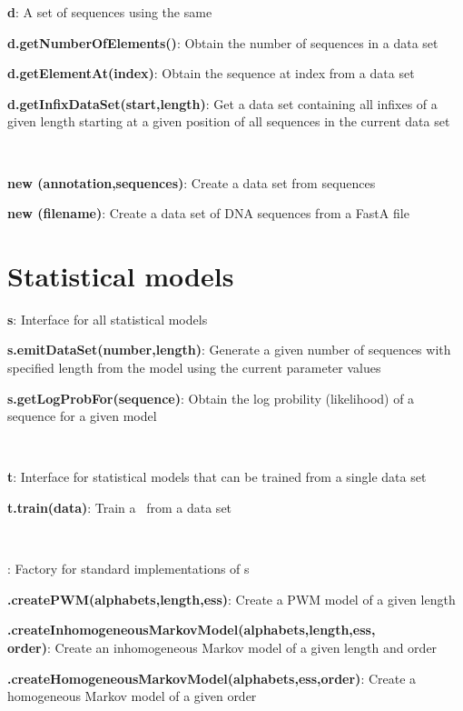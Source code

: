 \documentclass[10pt]{scrartcl}
\newcommand{\entry}[3]{{\bfseries #1#2}: #3}
\begin{document}
\begin{flushleft}
\entry{\DataSet}{ d}{A set of sequences using the same \AlphabetContainer}

\entry{d}{.getNumberOfElements()}{Obtain the number of sequences in a data set}

\entry{d}{.getElementAt(index)}{Obtain the sequence at index from a data set}

\entry{d}{.getInfixDataSet(start,length)}{Get a data set containing all infixes of a given length starting at a given position of all sequences in the current data set}

~

\entry{new \DataSet}{(annotation,sequences)}{Create a data set from sequences}

\entry{new \DNADataSet}{(filename)}{Create a data set of DNA sequences from a FastA file}

\section{Statistical models}

\entry{\StatMod}{ s}{Interface for all statistical models}

\entry{s}{.emitDataSet(number,length)}{Generate a given number of sequences with specified length from the model using the current parameter values}

\entry{s}{.getLogProbFor(sequence)}{Obtain the log probility (likelihood) of a sequence for a given model}

~

\entry{\TrainSM}{ t}{Interface for statistical models that can be trained from a single data set}

\entry{t}{.train(data)}{Train a \TrainSM~from a data set}

~

%
\entry{\TrainSMFactory}{}{Factory for standard implementations of \TrainSM s}

\entry{\TrainSMFactory}{.createPWM(alphabets,length,ess)}{Create a PWM model of a given length}

\entry{\TrainSMFactory}{.createInhomogeneousMarkovModel(alphabets,length,ess,\\order)}{Create an inhomogeneous Markov model of a given length and order}

\entry{\TrainSMFactory}{.createHomogeneousMarkovModel(alphabets,ess,order)}{Create a homogeneous Markov model of a given order}


\end{flushleft}
\end{document}
